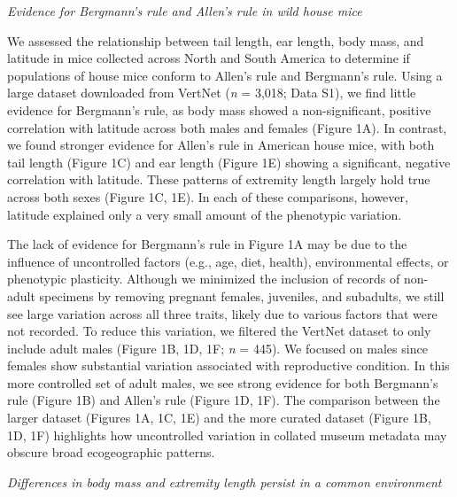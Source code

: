 \documentclass[]{article}
\begin{document}
\noindent\emph{Evidence for Bergmann's rule and Allen's rule in wild
house mice}

We assessed the relationship between tail length, ear length, body mass,
and latitude in mice collected across North and South America to
determine if populations of house mice conform to Allen's rule and
Bergmann's rule. Using a large dataset downloaded from VertNet (\emph{n}
= 3,018; Data S1), we find little evidence for Bergmann's rule, as body
mass showed a non-significant, positive correlation with latitude across
both males and females (Figure 1A). In contrast, we found stronger
evidence for Allen's rule in American house mice, with both tail length
(Figure 1C) and ear length (Figure 1E) showing a significant, negative
correlation with latitude. These patterns of extremity length largely
hold true across both sexes (Figure 1C, 1E). In each of these
comparisons, however, latitude explained only a very small amount of the
phenotypic variation.

The lack of evidence for Bergmann's rule in Figure 1A may be due to the
influence of uncontrolled factors (e.g., age, diet, health),
environmental effects, or phenotypic plasticity. Although we minimized
the inclusion of records of non-adult specimens by removing pregnant
females, juveniles, and subadults, we still see large variation across
all three traits, likely due to various factors that were not recorded.
To reduce this variation, we filtered the VertNet dataset to only
include adult males (Figure 1B, 1D, 1F; \emph{n} = 445). We focused on
males since females show substantial variation associated with
reproductive condition. In this more controlled set of adult males, we
see strong evidence for both Bergmann's rule (Figure 1B) and Allen's
rule (Figure 1D, 1F). The comparison between the larger dataset (Figures
1A, 1C, 1E) and the more curated dataset (Figure 1B, 1D, 1F) highlights
how uncontrolled variation in collated museum metadata may obscure broad
ecogeographic patterns.

\vspace{3.5mm}

\noindent\emph{Differences in body mass and extremity length persist in
a common environment}
\end{document}
